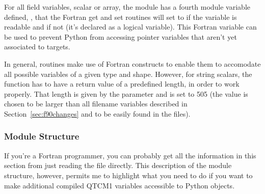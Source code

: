 \begin{codeblock}
\end{codeblock}

For all field variables, scalar or array, the  module
has a fourth module variable defined, , that the
Fortran get and set routines will set to  if the
variable is readable and  if not (it's declared as a
logical variable).  This Fortran variable can be used to prevent
Python from accessing pointer variables that aren't yet associated
to targets.

In general,  routines make use of Fortran constructs
to enable them to accomodate all possible
variables of a given type and shape.  However, 
for string scalars, the  function 
has to have a return value of a predefined length, in order to
work properly.  That length is given by the parameter
 and is set to 505 (the value is chosen to
be larger than all filename variables described in
Section~\ref{sec:f90changes} and to be easily found in
the  files).


		\subsubsection{Module Structure}

If you're a Fortran programmer, you can probably get all the information
in this section from just reading the  file directly.
This description of the module structure, however, permits me to highlight
what you need to do if you want to make additional compiled QTCM1 variables
accessible to Python  objects.

